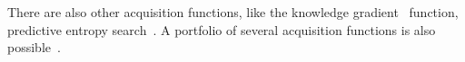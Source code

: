 
There are also other acquisition functions, like the knowledge gradient~\cite{scott2011correlated} function, predictive entropy search~\cite{hernandez2014predictive}. A portfolio of several acquisition functions is also possible~\cite{hoffman2011portfolio}.
